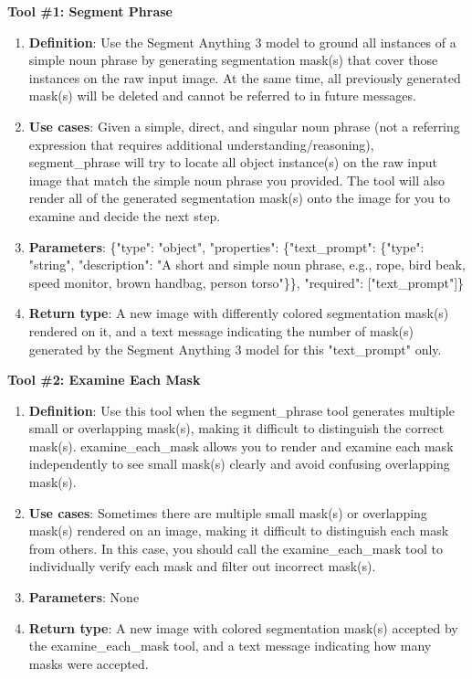\documentclass[]{fairmeta}
\begin{document}
\begin{onebox}{\normalfont\bfseries Tool \#1: Segment Phrase}
	\small
	\begin{enumerate}
		\item[(1)] \textbf{Definition}: Use the Segment Anything 3 model to ground all instances of a simple noun phrase by generating segmentation mask(s) that cover those instances on the raw input image. At the same time, all previously generated mask(s) will be deleted and cannot be referred to in future messages.
		\item[(2)] \textbf{Use cases}: Given a simple, direct, and singular noun phrase (not a referring expression that requires additional understanding/reasoning), segment\_phrase will try to locate all object instance(s) on the raw input image that match the simple noun phrase you provided. The tool will also render all of the generated segmentation mask(s) onto the image for you to examine and decide the next step.
		\item[(3)] \textbf{Parameters}: \{"type": "object", "properties": \{"text\_prompt": \{"type": "string", "description": "A short and simple noun phrase, e.g., rope, bird beak, speed monitor, brown handbag, person torso"\}\}, "required": ["text\_prompt"]\}
		\item[(4)] \textbf{Return type}: A new image with differently colored segmentation mask(s) rendered on it, and a text message indicating the number of mask(s) generated by the Segment Anything 3 model for this "text\_prompt" only.
	\end{enumerate}
\end{onebox}
\vspace{0.5em}
\begin{onebox}{\normalfont\bfseries Tool \#2: Examine Each Mask}
	\small
	\begin{enumerate}
		\item[(1)] \textbf{Definition}: Use this tool when the segment\_phrase tool generates multiple small or overlapping mask(s), making it difficult to distinguish the correct mask(s). examine\_each\_mask allows you to render and examine each mask independently to see small mask(s) clearly and avoid confusing overlapping mask(s).
		\item[(2)] \textbf{Use cases}: Sometimes there are multiple small mask(s) or overlapping mask(s) rendered on an image, making it difficult to distinguish each mask from others. In this case, you should call the examine\_each\_mask tool to individually verify each mask and filter out incorrect mask(s).
		\item[(3)] \textbf{Parameters}: None
		\item[(4)] \textbf{Return type}: A new image with colored segmentation mask(s) accepted by the examine\_each\_mask tool, and a text message indicating how many masks were accepted.
	\end{enumerate}
\end{onebox}
\end{document}
